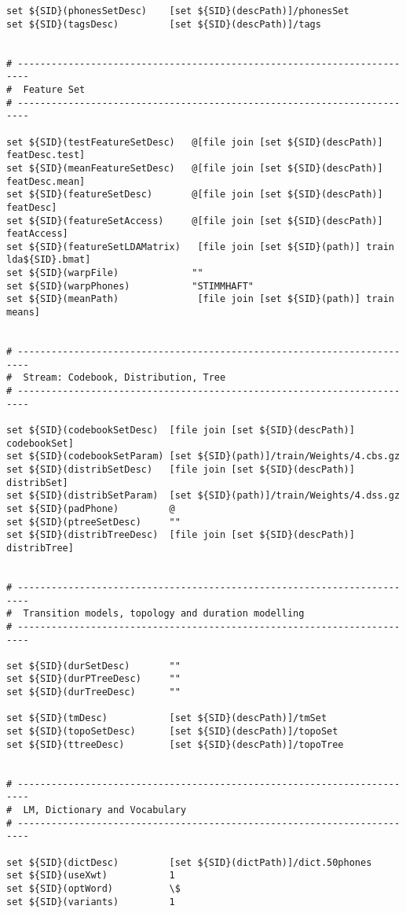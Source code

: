 {\begin{verbatim}
set ${SID}(phonesSetDesc)    [set ${SID}(descPath)]/phonesSet
set ${SID}(tagsDesc)         [set ${SID}(descPath)]/tags


# ------------------------------------------------------------------------
#  Feature Set
# ------------------------------------------------------------------------

set ${SID}(testFeatureSetDesc)   @[file join [set ${SID}(descPath)] featDesc.test]
set ${SID}(meanFeatureSetDesc)   @[file join [set ${SID}(descPath)] featDesc.mean]
set ${SID}(featureSetDesc)       @[file join [set ${SID}(descPath)] featDesc]
set ${SID}(featureSetAccess)     @[file join [set ${SID}(descPath)] featAccess]
set ${SID}(featureSetLDAMatrix)   [file join [set ${SID}(path)] train lda${SID}.bmat]
set ${SID}(warpFile)             ""
set ${SID}(warpPhones)           "STIMMHAFT"
set ${SID}(meanPath)              [file join [set ${SID}(path)] train means]


# ------------------------------------------------------------------------
#  Stream: Codebook, Distribution, Tree
# ------------------------------------------------------------------------

set ${SID}(codebookSetDesc)  [file join [set ${SID}(descPath)] codebookSet]
set ${SID}(codebookSetParam) [set ${SID}(path)]/train/Weights/4.cbs.gz
set ${SID}(distribSetDesc)   [file join [set ${SID}(descPath)] distribSet]
set ${SID}(distribSetParam)  [set ${SID}(path)]/train/Weights/4.dss.gz
set ${SID}(padPhone)         @
set ${SID}(ptreeSetDesc)     ""
set ${SID}(distribTreeDesc)  [file join [set ${SID}(descPath)] distribTree]


# ------------------------------------------------------------------------
#  Transition models, topology and duration modelling
# ------------------------------------------------------------------------

set ${SID}(durSetDesc)       ""
set ${SID}(durPTreeDesc)     ""
set ${SID}(durTreeDesc)      ""

set ${SID}(tmDesc)           [set ${SID}(descPath)]/tmSet
set ${SID}(topoSetDesc)      [set ${SID}(descPath)]/topoSet
set ${SID}(ttreeDesc)        [set ${SID}(descPath)]/topoTree


# ------------------------------------------------------------------------
#  LM, Dictionary and Vocabulary
# ------------------------------------------------------------------------

set ${SID}(dictDesc)         [set ${SID}(dictPath)]/dict.50phones
set ${SID}(useXwt)           1
set ${SID}(optWord)          \$
set ${SID}(variants)         1


\end{verbatim}}
